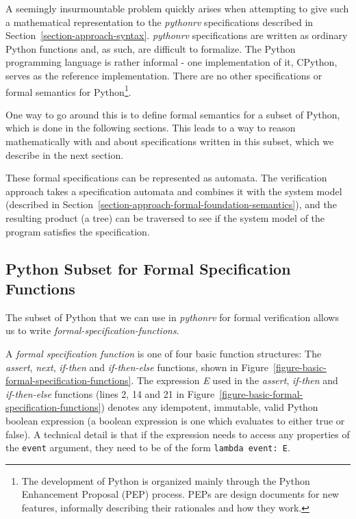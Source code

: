 A seemingly insurmountable problem quickly arises when attempting to give such
a mathematical representation to the \textit{pythonrv} specifications described
in Section~\ref{section-approach-syntax}. \textit{pythonrv} specifications are
written as ordinary Python functions and, as such, are difficult to formalize.
The Python programming language is rather informal - one implementation of it,
CPython, serves as the reference implementation. There are no other
specifications or formal semantics for Python\footnote{The development of
  Python is organized mainly through the Python Enhancement Proposal (PEP)
  process. PEPs are design documents for new features, informally describing
their rationales and how they work.}.

One way to go around this is to define formal semantics for a subset of Python,
which is done in the following sections. This leads to a way to reason
mathematically with and about specifications written in this subset, which we
describe in the next section.

These formal specifications can be represented as automata. The verification
approach takes a specification automata and combines it with the system model
(described in Section~\ref{section-approach-formal-foundation-semantics}), and
the resulting product (a tree) can be traversed to see if the system model of
the program satisfies the specification.




\subsection{Python Subset for Formal Specification Functions}
\label{section-approach-python-subset}
\lstset{language=Python,numbers=left}


The subset of Python that we can use in \textit{pythonrv} for formal
verification allows us to write \textit{formal-specification-functions}.

\begin{mydef}\label{def-formal-specification-function}
A \textit{formal specification function} is one of four basic function
structures: The \textit{assert}, \textit{next}, \textit{if-then} and
\textit{if-then-else} functions, shown in
Figure~\ref{figure-basic-formal-specification-functions}. The expression
\textit{E} used in the \textit{assert}, \textit{if-then} and
\textit{if-then-else} functions (lines 2, 14 and 21 in
Figure~\ref{figure-basic-formal-specification-functions}) denotes any
idempotent, immutable, valid Python boolean expression (a boolean expression is
one which evaluates to either true or false). A technical detail is that if the
expression needs to access any properties of the \texttt{event} argument, they
need to be of the form \texttt{lambda event: E}.
\end{mydef}

